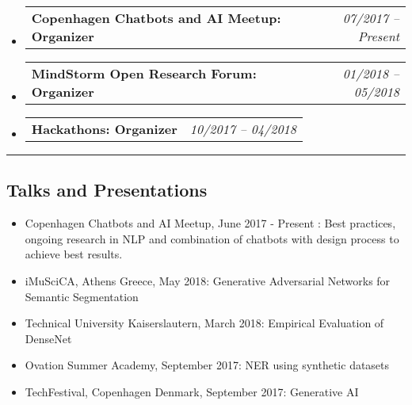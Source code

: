 \documentclass[10pt,letterpaper]{article}
\makeatletter
\newcommand{\headerrow}[2]
{\begin{tabular*}{\linewidth}{l@{\extracolsep{\fill}}r}
	#1 &
	#2 \\
\end{tabular*}}
\makeatother
\begin{document}
\begin{itemize}
	\parskip=0.1em
		\item 
	\headerrow
		{\textbf{\color{BrickRed}Copenhagen Chatbots and AI Meetup: Organizer}}
		{\emph{07/2017 -- Present}}
	
	\item 
	\headerrow
		{\textbf{\color{BrickRed}MindStorm Open Research Forum: Organizer}}
		{\emph{01/2018 -- 05/2018}}
	
		\item 
	\headerrow
		{\textbf{\color{BrickRed}Hackathons: Organizer}}
		{\emph{10/2017 -- 04/2018}}
	

\end{itemize}

\hrule
\vspace{-0.4em}
\subsection*{\color{MidnightBlue}Talks and Presentations}

\begin{itemize}
	\parskip=0.1em
	
	\item Copenhagen Chatbots and AI Meetup, June 2017 - Present : Best practices, ongoing research in NLP and combination of chatbots with design process to achieve best results.
	
	\item iMuSciCA, Athens Greece, May 2018: Generative Adversarial Networks for Semantic Segmentation 
	
	\item Technical University Kaiserslautern, March 2018: Empirical Evaluation of DenseNet 
		
	\item Ovation Summer Academy, September 2017: NER using synthetic datasets 
	
	\item TechFestival, Copenhagen Denmark, September 2017: Generative AI 
	
	
\end{itemize}
\end{document}
